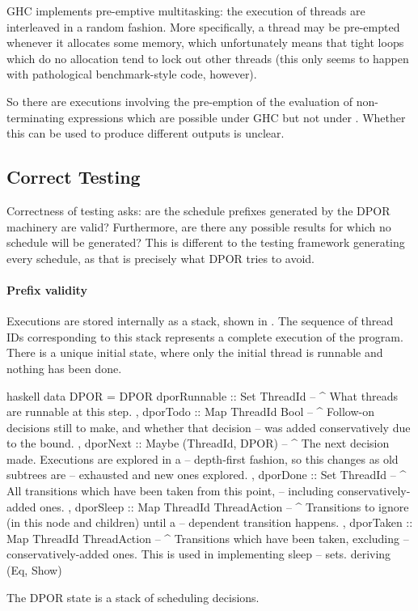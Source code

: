 \begin{displayquote}
  GHC implements pre-emptive multitasking: the execution of threads
  are interleaved in a random fashion.  More specifically, a thread may
  be pre-empted whenever it allocates some memory, which unfortunately
  means that tight loops which do no allocation tend to lock out other
  threads (this only seems to happen with pathological benchmark-style
  code, however).\cite{control_concurrent}
\end{displayquote}

So there are executions involving the pre-emption of the evaluation of
non-terminating expressions which are possible under GHC but not under
\dejafu{}.  Whether this can be used to produce different outputs is
unclear.

\subsection{Correct Testing}

Correctness of testing asks: are the schedule prefixes generated by
the DPOR machinery are valid?  Furthermore, are there any possible
results for which no schedule will be generated?  This is different to
the testing framework generating every schedule, as that is precisely
what DPOR tries to avoid.

\paragraph{Prefix validity}
Executions are stored internally as a stack, shown in .
The sequence of thread IDs corresponding to this stack represents a
complete execution of the program.  There is a unique initial state,
where only the initial thread is runnable and nothing has been done.

\begin{listing}
\centering
\begin{cminted}{haskell}
data DPOR = DPOR
  { dporRunnable :: Set ThreadId
  -- ^ What threads are runnable at this step.
  , dporTodo     :: Map ThreadId Bool
  -- ^ Follow-on decisions still to make, and whether that decision
  -- was added conservatively due to the bound.
  , dporNext     :: Maybe (ThreadId, DPOR)
  -- ^ The next decision made. Executions are explored in a
  -- depth-first fashion, so this changes as old subtrees are
  -- exhausted and new ones explored.
  , dporDone     :: Set ThreadId
  -- ^ All transitions which have been taken from this point,
  -- including conservatively-added ones.
  , dporSleep    :: Map ThreadId ThreadAction
  -- ^ Transitions to ignore (in this node and children) until a
  -- dependent transition happens.
  , dporTaken    :: Map ThreadId ThreadAction
  -- ^ Transitions which have been taken, excluding
  -- conservatively-added ones. This is used in implementing sleep
  -- sets.
  } deriving (Eq, Show)
\end{cminted}
\caption[The \dejafu{} DPOR state.]{The DPOR state is a stack of scheduling decisions.}\label{lst:dpor}
\end{listing}

